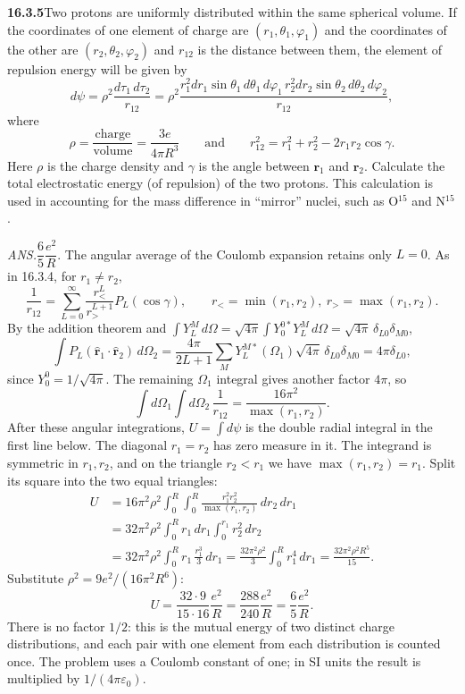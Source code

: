 \par\bigskip
\noindent\textbf{16.3.5}\quad Two protons are uniformly distributed
within the same spherical volume. If the coordinates of one element
of charge are $(r_{1},\theta_{1},\varphi_{1})$ and the coordinates of
the other are $(r_{2},\theta_{2},\varphi_{2})$ and $r_{12}$ is the
distance between them, the element of repulsion energy will be given
by
\[
d\psi=\rho^{2}\frac{d\tau_{1}\,d\tau_{2}}{r_{12}}
=\rho^{2}\frac{r_{1}^{2}dr_{1}\sin\theta_{1}\,d\theta_{1}\,d\varphi_{1}\,
r_{2}^{2}dr_{2}\sin\theta_{2}\,d\theta_{2}\,d\varphi_{2}}{r_{12}},
\]
where
\[
\rho=\frac{\text{charge}}{\text{volume}}=\frac{3e}{4\pi R^{3}}
\qquad\text{and}\qquad
r_{12}^{2}=r_{1}^{2}+r_{2}^{2}-2r_{1}r_{2}\cos\gamma.
\]
Here $\rho$ is the charge density and $\gamma$ is the angle between
$\mathbf{r}_{1}$ and $\mathbf{r}_{2}$. Calculate the total
electrostatic energy (of repulsion) of the two protons. This
calculation is used in accounting for the mass difference in
``mirror'' nuclei, such as O${}^{15}$ and N${}^{15}$.
\par\nobreak\hfill\emph{ANS.}\enspace$\dfrac{6}{5}\dfrac{e^{2}}{R}$.
\solution
The angular average of the Coulomb expansion retains only $L=0$.
As in 16.3.4, for $r_1\ne r_2$,
\[
\frac1{r_{12}}=\sum_{L=0}^{\infty}\frac{r_<^L}{r_>^{L+1}}
P_L(\cos\gamma),\qquad r_<=\min(r_1,r_2),\ r_>=\max(r_1,r_2).
\]
By the addition theorem and $\int Y_L^M\,d\Omega
=\sqrt{4\pi}\int Y_0^{0*}Y_L^M\,d\Omega=\sqrt{4\pi}\,\delta_{L0}\delta_{M0}$,
\[
\int P_L(\hat{\mathbf r}_1\cdot\hat{\mathbf r}_2)\,d\Omega_2
=\frac{4\pi}{2L+1}\sum_{M}Y_L^{M*}(\Omega_1)\sqrt{4\pi}\,
\delta_{L0}\delta_{M0}=4\pi\delta_{L0},
\]
since $Y_0^0=1/\sqrt{4\pi}$. The remaining $\Omega_1$ integral
gives another factor $4\pi$, so
\[
\int d\Omega_1\int d\Omega_2\,\frac1{r_{12}}
=\frac{16\pi^2}{\max(r_1,r_2)}.
\]
After these angular integrations, $U=\int d\psi$ is the double radial
integral in the first line below. The diagonal $r_1=r_2$ has zero
measure in it. The integrand is symmetric in $r_1,r_2$, and on the
triangle $r_2<r_1$ we have $\max(r_1,r_2)=r_1$. Split its square
into the two equal triangles:
\[
\begin{aligned}
U&=16\pi^2\rho^2\int_0^R\!\!\int_0^R
\frac{r_1^2r_2^2}{\max(r_1,r_2)}\,dr_2\,dr_1\\
&=32\pi^2\rho^2\int_0^R r_1\,dr_1
\int_0^{r_1}r_2^2\,dr_2\\
&=32\pi^2\rho^2\int_0^R r_1\,\frac{r_1^3}{3}\,dr_1
=\frac{32\pi^2\rho^2}{3}\int_0^R r_1^4\,dr_1
=\frac{32\pi^2\rho^2R^5}{15}.
\end{aligned}
\]
Substitute $\rho^2=9e^2/(16\pi^2R^6)$:
\[
\boxed{U=\frac{32\cdot9}{15\cdot16}\frac{e^2}{R}
=\frac{288}{240}\frac{e^2}{R}
=\frac65\frac{e^2}{R}}.
\]
There is no factor $1/2$: this is the mutual energy of two distinct
charge distributions, and each pair with one element from each
distribution is counted once. The problem uses a Coulomb constant
of one; in SI units the result is multiplied by $1/(4\pi\varepsilon_0)$.

